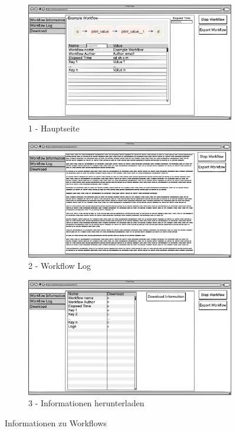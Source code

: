 \begin{figure}[ht]
    \begin{subfigure}{.75\textwidth}
        \centering
        \includegraphics[width = \textwidth]{Grafiken/Gui Mockups/workflowGui-InformationMain.png}
        \caption{1 - Hauptseite}
        \label{fig:sfig3}
    \end{subfigure}
    \begin{subfigure}{.75\textwidth}
        \centering
        \includegraphics[width = \textwidth]{Grafiken/Gui Mockups/workflowGui-InformationLog.png}
        \caption{2 - Workflow Log}
        \label{fig:sfig4}
    \end{subfigure}
    \begin{subfigure}{.75\textwidth}
        \centering
        \includegraphics[width = \textwidth]{Grafiken/Gui Mockups/workflowGui-InformationDownload.png}
        \caption{3 - Informationen herunterladen}
        \label{fig:sfig5}
    \end{subfigure}
    \centering
    \caption{Informationen zu Workflows}
    \label{fig:Abb 6}
\end{figure}

